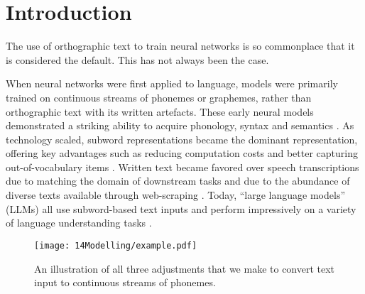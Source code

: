 \section{Introduction}


The use of orthographic text to train neural networks is so commonplace that it is considered the default. This has not always been the case.

When neural networks were first applied to language, models were primarily trained on continuous streams of phonemes or graphemes, rather than orthographic text with its written artefacts. These early neural models demonstrated a striking ability to acquire phonology, syntax and semantics \citep{elman-1990-finding, seidenberg-1989-word-recognition, prince-1997-optimality}. As technology scaled, subword representations became the dominant representation, offering key advantages such as reducing computation costs and better capturing out-of-vocabulary items \citep{sennrich-etal-2016-bpe}. Written text became favored over speech transcriptions due to matching the domain of downstream tasks and due to the abundance of diverse texts available through web-scraping \citep{bansal-2022-datascaling}. Today, ``large language models'' (LLMs) all use subword-based text inputs and perform impressively on a variety of language understanding tasks \citep{zellers-etal-2019-hellaswag, hendrycks-2020-mmlu, suzgun-2023-Big-Bench}.

\begin{figure}[t]
    \centering
    \texttt{[image: 14Modelling/example.pdf]}
    \caption{An illustration of all three adjustments that we make to convert text input to continuous streams of phonemes.}
    \label{fix:14-example}
    \vspace{-6mm}
\end{figure}



